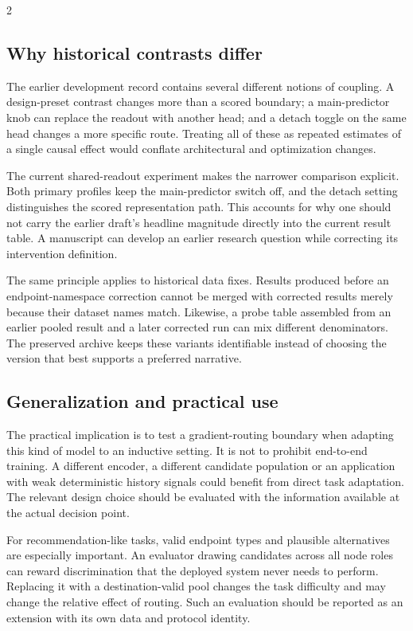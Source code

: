 \documentclass[a4paper,10pt]{article}
\begin{document}
\begin{multicols}{2}
\subsection{Why historical contrasts differ}
The earlier development record contains several different notions of coupling. A design-preset contrast changes more than a scored boundary; a main-predictor knob can replace the readout with another head; and a detach toggle on the same head changes a more specific route. Treating all of these as repeated estimates of a single causal effect would conflate architectural and optimization changes.

The current shared-readout experiment makes the narrower comparison explicit. Both primary profiles keep the main-predictor switch off, and the detach setting distinguishes the scored representation path. This accounts for why one should not carry the earlier draft's headline magnitude directly into the current result table. A manuscript can develop an earlier research question while correcting its intervention definition.

The same principle applies to historical data fixes. Results produced before an endpoint-namespace correction cannot be merged with corrected results merely because their dataset names match. Likewise, a probe table assembled from an earlier pooled result and a later corrected run can mix different denominators. The preserved archive keeps these variants identifiable instead of choosing the version that best supports a preferred narrative.

\subsection{Generalization and practical use}
The practical implication is to test a gradient-routing boundary when adapting this kind of model to an inductive setting. It is not to prohibit end-to-end training. A different encoder, a different candidate population or an application with weak deterministic history signals could benefit from direct task adaptation. The relevant design choice should be evaluated with the information available at the actual decision point.

For recommendation-like tasks, valid endpoint types and plausible alternatives are especially important. An evaluator drawing candidates across all node roles can reward discrimination that the deployed system never needs to perform. Replacing it with a destination-valid pool changes the task difficulty and may change the relative effect of routing. Such an evaluation should be reported as an extension with its own data and protocol identity.


\end{multicols}
\end{document}

